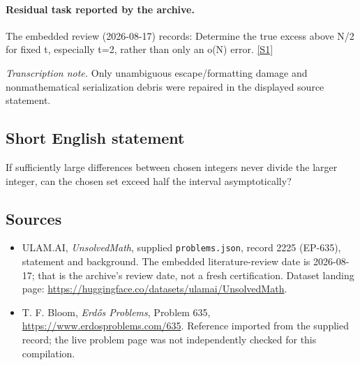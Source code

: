 \documentclass[11pt,a4paper]{article}
\newcommand{\sref}[2]{\hyperlink{source:#1:#2}{[S#2]}}
\begin{document}
\paragraph{Residual task reported by the archive.}

The embedded review (2026-08-17) records: Determine the true excess above N/2 for fixed t, especially t=2, rather than only an o(N) error. \sref{2225}{1}

{\small\emph{Transcription note.} Only unambiguous escape/formatting damage and nonmathematical serialization debris were repaired in the displayed source statement.}

\subsection{Short English statement}

If sufficiently large differences between chosen integers never divide the larger integer, can the chosen set exceed half the interval asymptotically?

\subsection{Sources}

{\small

\begin{itemize}

\item[\hypertarget{source:2225:1}{S1}] ULAM.AI, \emph{UnsolvedMath}, supplied \texttt{problems.json}, record 2225 (EP-635), statement and background. The embedded literature-review date is 2026-08-17; that is the archive’s review date, not a fresh certification. Dataset landing page: \url{https://huggingface.co/datasets/ulamai/UnsolvedMath}.

\item[\hypertarget{source:2225:2}{S2}] T. F. Bloom, \emph{Erdős Problems}, Problem 635, \url{https://www.erdosproblems.com/635}. Reference imported from the supplied record; the live problem page was not independently checked for this compilation.

\end{itemize}

}

\label{end:2225}
\end{document}
